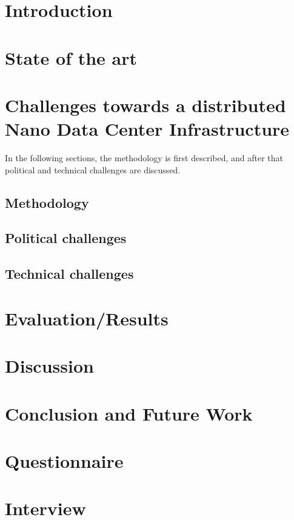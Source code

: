 
\section{Introduction}


\section{State of the art}


\section{Challenges towards a distributed Nano Data Center Infrastructure}
In the following sections, the methodology is first described, and after that political and technical challenges are discussed. 

\subsection{Methodology}



\subsection{Political challenges}

\subsection{Technical challenges}


\section{Evaluation/Results}


\section{Discussion}


\section{Conclusion and Future Work}


\begin{acks}

\end{acks}




\appendix
\section{Questionnaire}

\section{Interview}

